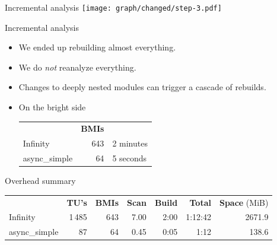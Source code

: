 \documentclass[aspectratio=169]{beamer}
\begin{document}
\begin{frame}{Incremental analysis }
  \texttt{[image: graph/changed/step-3.pdf]}
\end{frame}


\begin{frame}{Incremental analysis}
  \begin{itemize}
    \item We ended up rebuilding almost everything.
    \item We do \emph{not} reanalyze everything.
    \item Changes to deeply nested modules can trigger a cascade of rebuilds.
    \item On the bright side
          \begin{table}
            \begin{tabular}{l r l}
                            & \textbf{BMIs} &           \\
              Infinity      & 643           & 2 minutes \\
              async\_simple & 64            & 5 seconds
            \end{tabular}
          \end{table}
  \end{itemize}
\end{frame}

\begin{frame}{Overhead summary}
  \footnotesize\begin{table}
    \begin{tabular}{l r r r r r r}
                    & \textbf{TU's} & \textbf{BMIs} & \textbf{Scan} & \textbf{Build} & \textbf{Total} & \textbf{Space} (MiB) \\
      Infinity      & 1\,485        & 643           & 7.00          & 2:00           & 1:12:42        & 2671.9               \\
      async\_simple & 87            & 64            & 0.45          & 0:05           & 1:12           & 138.6
    \end{tabular}
  \end{table}
\end{frame}
\end{document}
